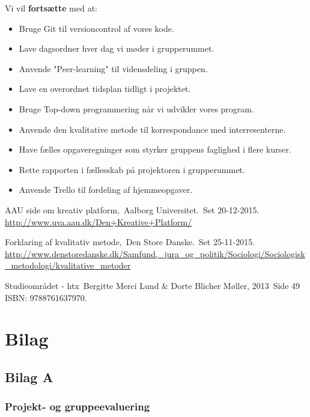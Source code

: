 \documentclass[oneside,a4paper,titlepage]{article}
\begin{document}
Vi vil \textbf{fortsætte} med at:
\begin{itemize}
  \item Bruge Git til versioncontrol af vores kode.
  \item Lave dagsordner hver dag vi møder i grupperummet.
  \item Anvende "Peer-learning" til vidensdeling i gruppen. 
  \item Lave en overordnet tidsplan tidligt i projektet. 
  \item Bruge Top-down programmering når vi udvikler vores program.
  \item Anvende den kvalitative metode til korrespondance med interresenterne. 
  \item Have fælles opgaveregninger som styrker gruppens faglighed i flere kurser.
  \item Rette rapporten i fællesskab på projektoren i grupperummet.
  \item Anvende Trello til fordeling af hjemmeopgaver.
\end{itemize}

\begin{thebibliography}{99}
  AAU side om kreativ platform,\
  Aalborg Universitet.\
  Set 20-12-2015.\\
  \url{http://www.uva.aau.dk/Den+Kreative+Platform/}

  Forklaring af kvalitativ metode,\
  Den Store Danske.\
  Set 25-11-2015.\\
  \url{http://www.denstoredanske.dk/Samfund,_jura_og_politik/Sociologi/Sociologisk_metodologi/kvalitative_metoder}

\bibitem{SO_bog}  
  Studieområdet - htx\
  Bergitte Merci Lund \& Dorte Blicher Møller, 2013\
  Side 49\\
  ISBN: 9788761637970.
  
\end{thebibliography}

\section{Bilag}


\subsection{Bilag A}

\subsubsection*{Projekt- og gruppeevaluering}
\label{sec:gruppeevaluering}
\end{document}
